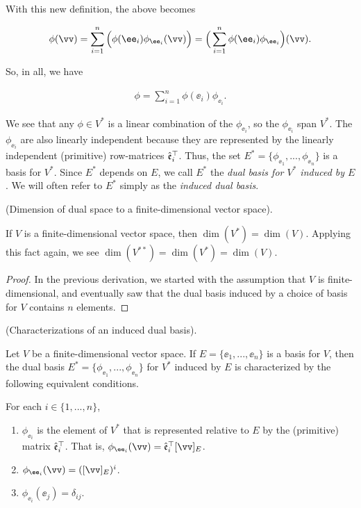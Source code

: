 \begin{deriv}
    With this new definition, the above becomes
    
    \begin{align*}
        \phi(\vv) 
        = \sum_{i = 1}^n \Big( \phi(\ee_i) \phi_{\ee_i}(\vv) \Big)
        = \Big( \sum_{i = 1}^n \phi(\ee_i) \phi_{\ee_i} \Big)(\vv).
    \end{align*}
    
    So, in all, we have
    
    \begin{align*}
        \phi = \sum_{i = 1}^n \phi(\ee_i) \phi_{\ee_i}.
    \end{align*}
    
    We see that any $\phi \in V^*$ is a linear combination of the $\phi_{\ee_i}$, so the $\phi_{\ee_i}$ span $V^*$. The $\phi_{\ee_i}$ are also linearly independent because they are represented by the linearly independent (primitive) row-matrices $\hat{\mathfrak{e}}_i^\top$. Thus, the set $E^* = \{\phi_{\ee_1}, ..., \phi_{\ee_n}\}$ is a basis for $V^*$. Since $E^*$ depends on $E$, we call $E^*$ the \textit{dual basis for $V^*$ induced by $E$}. We will often refer to $E^*$ simply as the \textit{induced dual basis}.
\end{deriv}

\begin{theorem}
\label{ch::motivated_intro::deriv::dim_dual_space}
    (Dimension of dual space to a finite-dimensional vector space).
    
    If $V$ is a finite-dimensional vector space, then $\dim(V^*) = \dim(V)$. Applying this fact again, we see $\dim(V^{**}) = \dim(V^*) = \dim(V)$.
\end{theorem}

\begin{proof}
    In the previous derivation, we started with the assumption that $V$ is finite-dimensional, and eventually saw that the dual basis induced by a choice of basis for $V$ contains $n$ elements.
\end{proof}

\begin{theorem}
    (Characterizations of an induced dual basis).
     
    Let $V$ be a finite-dimensional vector space. If $E = \{\ee_1, ..., \ee_n\}$ is a basis for $V$, then the dual basis $E^* = \{\phi_{\ee_1}, ..., \phi_{\ee_n}\}$ for $V^*$ induced by $E$ is characterized by the following equivalent conditions.
    
    \vspace{.25cm}
    
    For each $i \in \{1, ..., n\}$,
     
    \begin{enumerate}
        \item $\phi_{\ee_i}$ is the element of $V^*$ that is represented relative to $E$ by the (primitive) matrix $\hat{\mathfrak{e}}_i^\top$. That is, $\phi_{\ee_i}(\vv) = \see_i^\top [\vv]_E$.
        \item $\phi_{\ee_i}(\vv) = ([\vv]_E)^i$.
        \item $\phi_{\ee_i}(\ee_j) = \delta_{ij}$.
    \end{enumerate}
\end{theorem}

